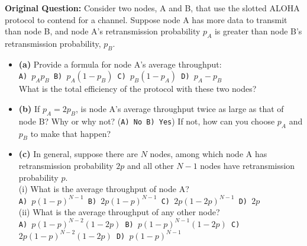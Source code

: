 
\textbf{Original Question:} Consider two nodes, A and B, that use the slotted ALOHA protocol to contend for a channel. Suppose node A has more data to transmit than node B, and node A's retransmission probability $p_A$ is greater than node B's retransmission probability, $p_B$.
\begin{itemize}
\item \textbf{(a)} Provide a formula for node A's average throughput: \\
\texttt{A) $p_A p_B$ \quad B) $p_A(1 - p_B)$ \quad C) $p_B(1 - p_A)$ \quad D) $p_A - p_B$} \\
What is the total efficiency of the protocol with these two nodes?
\item \textbf{(b)} If $p_A = 2 p_B$, is node A's average throughput twice as large as that of node B? Why or why not? (\texttt{A) No \quad B) Yes}) If not, how can you choose $p_A$ and $p_B$ to make that happen?
\item \textbf{(c)} In general, suppose there are $N$ nodes, among which node A has retransmission probability $2p$ and all other $N-1$ nodes have retransmission probability $p$. \\
(i) What is the average throughput of node A? \\
\texttt{A) $p(1-p)^{N-1}$ \quad B) $2p(1-p)^{N-1}$ \quad C) $2p(1-2p)^{N-1}$ \quad D) $2p$} \\
(ii) What is the average throughput of any other node? \\
\texttt{A) $p(1-p)^{N-2}(1-2p)$ \quad B) $p(1-p)^{N-1}(1-2p)$ \quad C) $2p(1-p)^{N-2}(1-2p)$ \quad D) $p(1-p)^{N-1}$}
\end{itemize}

